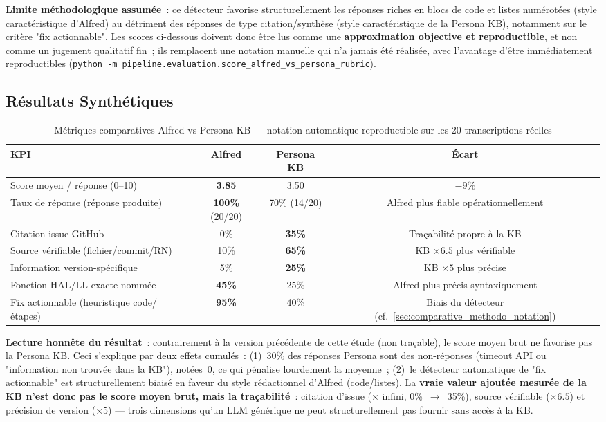 \textbf{Limite méthodologique assumée}~: ce détecteur favorise structurellement les réponses riches en blocs de code et listes numérotées (style caractéristique d'Alfred) au détriment des réponses de type citation/synthèse (style caractéristique de la Persona KB), notamment sur le critère "fix actionnable". Les scores ci-dessous doivent donc être lus comme une \textbf{approximation objective et reproductible}, et non comme un jugement qualitatif fin~; ils remplacent une notation manuelle qui n'a jamais été réalisée, avec l'avantage d'être immédiatement reproductibles (\texttt{python -m pipeline.evaluation.score\_alfred\_vs\_persona\_rubric}).

\subsection{Résultats Synthétiques}

\begin{table}[H]
\centering
\begin{tabular}{lccc}
\toprule
\textbf{KPI} & \textbf{Alfred} & \textbf{Persona KB} & \textbf{Écart} \\
\midrule
Score moyen / réponse (0--10) & \textbf{3.85} & 3.50 & $-9\%$ \\
Taux de réponse (réponse produite) & \textbf{100\%} (20/20) & 70\% (14/20) & Alfred plus fiable opérationnellement \\
Citation issue GitHub & 0\% & \textbf{35\%} & Traçabilité propre à la KB \\
Source vérifiable (fichier/commit/RN) & 10\% & \textbf{65\%} & KB $\times 6.5$ plus vérifiable \\
Information version-spécifique & 5\% & \textbf{25\%} & KB $\times 5$ plus précise \\
Fonction HAL/LL exacte nommée & \textbf{45\%} & 25\% & Alfred plus précis syntaxiquement \\
Fix actionnable (heuristique code/étapes) & \textbf{95\%} & 40\% & Biais du détecteur (cf.~\ref{sec:comparative_methodo_notation}) \\
\bottomrule
\end{tabular}
\caption{Métriques comparatives Alfred vs Persona KB --- notation automatique reproductible sur les 20 transcriptions réelles}
\label{tab:comparative_final}
\end{table}

\textbf{Lecture honnête du résultat}~: contrairement à la version précédente de cette étude (non traçable), le score moyen brut ne favorise pas la Persona KB. Ceci s'explique par deux effets cumulés~: (1)~30\% des réponses Persona sont des non-réponses (timeout API ou "information non trouvée dans la KB"), notées~0, ce qui pénalise lourdement la moyenne~; (2)~le détecteur automatique de "fix actionnable" est structurellement biaisé en faveur du style rédactionnel d'Alfred (code/listes). La \textbf{vraie valeur ajoutée mesurée de la KB n'est donc pas le score moyen brut, mais la traçabilité}~: citation d'issue ($\times$ infini, 0\%~$\to$~35\%), source vérifiable ($\times 6.5$) et précision de version ($\times 5$) --- trois dimensions qu'un LLM générique ne peut structurellement pas fournir sans accès à la KB.

